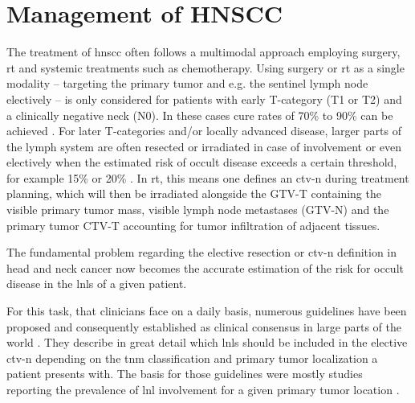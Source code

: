 \documentclass[\relativeRoot/main.tex]{subfiles}
\begin{document}
\section{Management of HNSCC}
\label{sec:intro:management}

The treatment of \gls{hnscc} often follows a multimodal approach employing surgery, \gls{rt} and systemic treatments such as chemotherapy. Using surgery or \acrlong{rt} as a single modality -- targeting the primary tumor and e.g. the sentinel lymph node electively -- is only considered for patients with early T-category (T1 or T2) and a clinically negative neck (N0). In these cases cure rates of 70\% to 90\% can be achieved \cite{pfister_head_2014}. For later T-categories and/or locally advanced disease, larger parts of the lymph system are often resected or irradiated in case of involvement or even electively when the estimated risk of occult disease exceeds a certain threshold, for example 15\% or 20\% \cite{weiss_use_1997,pitman_rationale_2000,pillsbury_iii_rationale_1997}. In \acrlong{rt}, this means one defines an \gls{ctv-n} during treatment planning, which will then be irradiated alongside the GTV-T containing the visible primary tumor mass, visible lymph node metastases (GTV-N) and the primary tumor CTV-T accounting for tumor infiltration of adjacent tissues.

The fundamental problem regarding the elective resection or \gls{ctv-n} definition in head and neck cancer now becomes the accurate estimation of the risk for occult disease in the \glspl{lnl} of a given patient.

For this task, that clinicians face on a daily basis, numerous guidelines have been proposed and consequently established as clinical consensus in large parts of the world \cite{gregoire_ct-based_2003,gregoire_delineation_2014,gregoire_delineation_2018,gregoire_proposal_2006,gregoire_selection_2000,biau_selection_2019,eisbruch_intensity-modulated_2002,ferlito_elective_2009,vorwerk_guidelines_2011,chao_determination_2002}. They describe in great detail which \glspl{lnl} should be included in the elective \gls{ctv-n} depending on the \gls{tnm} classification and primary tumor localization a patient presents with. The basis for those guidelines were mostly studies reporting the prevalence of \gls{lnl} involvement for a given primary tumor location \cite{candela_patterns_1990,shah_patterns_1990,woolgar_histological_1999,woolgar_topography_2007,chao_determination_2002,vauterin_patterns_2006,razfar_incidence_2009,ho_patterns_2012}.
\end{document}
